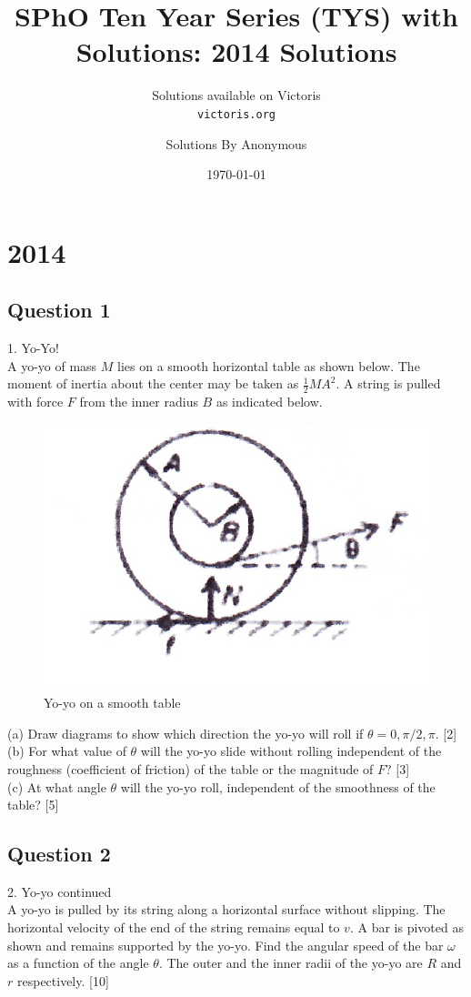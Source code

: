 \documentclass{article}
\title{SPhO Ten Year Series (TYS) with Solutions: 2014 Solutions}
\author{
    Solutions available on Victoris\\
    \texttt{victoris.org}
    \and 
    Solutions By Anonymous
}
\date{\today}
\begin{document}
\maketitle


\section{2014}
\subsection{Question 1}
1. Yo-Yo! \\ A yo-yo of mass $M$ lies on a smooth horizontal table as shown below. The moment of inertia about the center may be taken as $\frac{1}{2} M A^{2} .$ A string is pulled with force $F$ from the inner radius $B$ as indicated below.

\begin{figure}
	\centering
	\includegraphics[width=0.5\linewidth]{spho_book_TYS_images/2014q1.png}
	\caption{Yo-yo on a smooth table}
\end{figure}

(a) Draw diagrams to show which direction the yo-yo will roll if $\theta=0, \pi / 2, \pi .$ [2] \\
(b) For what value of $\theta$ will the yo-yo slide without rolling independent of the roughness (coefficient of friction) of the table or the magnitude of $F$? [3] \\
(c) At what angle $\theta$ will the yo-yo roll, independent of the smoothness of the table? [5]

\subsection{Question 2}
2. Yo-yo continued \\ A yo-yo is pulled by its string along a horizontal surface without slipping. The horizontal velocity of the end of the string remains equal to $v .$ A bar is pivoted as shown and remains supported by the yo-yo. Find the angular speed of the bar $\omega$ as a function of the angle $\theta$. The outer and the inner radii of the yo-yo are $R$ and $r$ respectively. [10]
\end{document}
